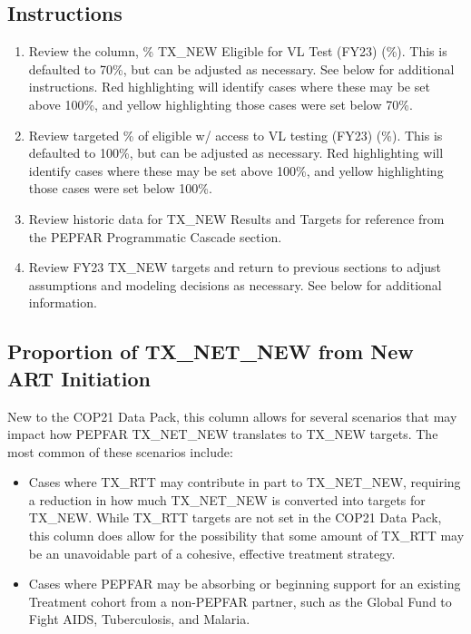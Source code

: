 \documentclass[
  openany]{book}
\begin{document}
\hypertarget{instructions-6}{%
\subsection{Instructions}\label{instructions-6}}

\begin{enumerate}
\def\labelenumi{\arabic{enumi}.}
\item
  Review the column, \% TX\_NEW Eligible for VL Test (FY23) (\%). This is
  defaulted to 70\%, but can be adjusted as necessary. See below for
  additional instructions. Red highlighting will identify cases where
  these may be set above 100\%, and yellow highlighting those cases
  were set below 70\%.
\item
  Review targeted \% of eligible w/ access to VL testing (FY23) (\%).
  This is defaulted to 100\%, but can be adjusted as necessary. Red
  highlighting will identify cases where these may be set above 100\%,
  and yellow highlighting those cases were set below 100\%.
\item
  Review historic data for TX\_NEW Results and Targets for reference
  from the PEPFAR Programmatic Cascade section.
\item
  Review FY23 TX\_NEW targets and return to previous sections to adjust
  assumptions and modeling decisions as necessary. See below for
  additional information.
\end{enumerate}

\hypertarget{proportion-of-tx_net_new-from-new-art-initiation}{%
\subsection{Proportion of TX\_NET\_NEW from New ART Initiation}\label{proportion-of-tx_net_new-from-new-art-initiation}}

New to the COP21 Data Pack, this column allows for several scenarios
that may impact how PEPFAR TX\_NET\_NEW translates to TX\_NEW targets. The
most common of these scenarios include:

\begin{itemize}
\item
  Cases where TX\_RTT may contribute in part to TX\_NET\_NEW, requiring a
  reduction in how much TX\_NET\_NEW is converted into targets for
  TX\_NEW. While TX\_RTT targets are not set in the COP21 Data Pack,
  this column does allow for the possibility that some amount of
  TX\_RTT may be an unavoidable part of a cohesive, effective treatment
  strategy.
\item
  Cases where PEPFAR may be absorbing or beginning support for an
  existing Treatment cohort from a non-PEPFAR partner, such as the
  Global Fund to Fight AIDS, Tuberculosis, and Malaria.
\end{itemize}
\end{document}
